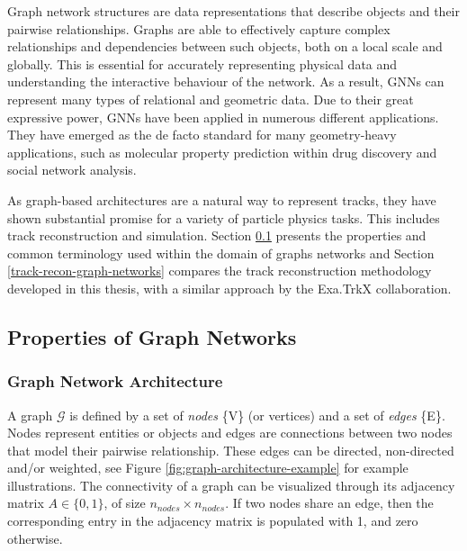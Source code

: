 Graph network structures are data representations that describe objects and their pairwise relationships. Graphs are able to effectively capture complex relationships and dependencies between such objects, both on a local scale and globally. This is essential for accurately representing physical data and understanding the interactive behaviour of the network. As a result, GNNs can represent many types of relational and geometric data. Due to their great expressive power, GNNs have been applied in numerous different applications. They have emerged as the de facto standard for many geometry-heavy applications, such as molecular property prediction within drug discovery and social network analysis.

As graph-based architectures are a natural way to represent tracks, they have shown substantial promise for a variety of particle physics tasks. This includes track reconstruction and simulation. Section \ref{properties-graph-networks} presents the properties and common terminology used within the domain of graphs networks and Section \ref{track-recon-graph-networks} compares the track reconstruction methodology developed in this thesis, with a similar approach by the Exa.TrkX collaboration.




\subsection{Properties of Graph Networks}
\label{properties-graph-networks}

\subsubsection{Graph Network Architecture}

A graph $\mathcal{G}$ is defined by a set of \textit{nodes} \{V\} (or vertices) and a set of \textit{edges} \{E\}. Nodes represent entities or objects and edges are connections between two nodes that model their pairwise relationship. These edges can be directed, non-directed and/or weighted, see Figure \ref{fig:graph-architecture-example} for example illustrations. The connectivity of a graph can be visualized through its adjacency matrix $A \in \{0, 1\}$, of size $n_{nodes} \times n_{nodes}$. If two nodes share an edge, then the corresponding entry in the adjacency matrix is populated with 1, and zero otherwise. 

